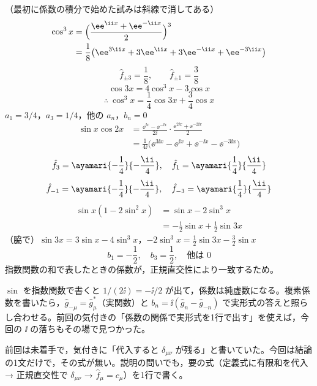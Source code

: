 （最初に係数の積分で始めた試みは斜線で消してある）
\begin{align*}
  \cos^{3}x&=\Bigl(\frac{\ee^{\ii x}+\ee^{-\ii x}}{2}\Bigr)^{3}\\
  &=\frac{1}{8}\bigl(\ee^{3\ii x}+3\ee^{\ii x}+3\ee^{-\ii x}+\ee^{-3\ii x}\bigr)
\end{align*}
\[ \hat{f}_{\pm3}=\frac{1}{8},\qquad\hat{f}_{\pm1}=\frac{3}{8} \]
\[ \cos3x=4\cos^{3}x-3\cos x \]
\[ \therefore\ \cos^{3}x=\frac{1}{4}\cos3x+\frac{3}{4}\cos x \]
$a_1=3/4$，$a_3=1/4$，他の $a_n$，$b_n=0$
\begin{align*}
  \sin x\cos2x&=\frac{\ee^{\ii x}-\ee^{-\ii x}}{2\ii}\cdot\frac{\ee^{2\ii x}+\ee^{-2\ii x}}{2}\\
  &=\frac{1}{4\ii}\bigl(\ee^{3\ii x}-\ee^{\ii x}+\ee^{-\ii x}-\ee^{-3\ii x}\bigr)
\end{align*}
\[ \hat{f}_3=\ayamari{-\frac{1}{4}}{-\frac{\ii}{4}},\quad\hat{f}_1=\ayamari{\frac{1}{4}}{\frac{\ii}{4}} \]
\[ \hat{f}_{-1}=\ayamari{-\frac{1}{4}}{-\frac{\ii}{4}},\quad\hat{f}_{-3}=\ayamari{\frac{1}{4}}{\frac{\ii}{4}} \]
\begin{align*}
  \sin x(1-2\sin^{2}x)&=\sin x-2\sin^{3}x\\
  &=-\frac{1}{2}\sin x+\frac{1}{2}\sin3x
\end{align*}
（脇で）$\sin3x=3\sin x-4\sin^{3}x$，$-2\sin^{3}x=\frac{1}{2}\sin3x-\frac{3}{2}\sin x$
\[ b_1=-\frac{1}{2},\quad b_3=\frac{1}{2},\quad\text{他は }0 \]
指数関数の和で表したときの係数が，正規直交性により一致するため。
\item {} $\sin$ を指数関数で書くと $1/(2\ii)=-\ii/2$ が出て，係数は純虚数になる。複素係数を書いたら，$\hat{g}_{-\mu}=\hat{g}_{\mu}^{*}$（実関数）と $b_n=\ii(\hat{g}_n-\hat{g}_{-n})$ で実形式の答えと照らし合わせる。前回の気付きの「係数の関係で実形式を1行で出す」を使えば，今回の $\ii$ の落ちもその場で見つかった。
\item {} 前回は未着手で，気付きに「代入すると $\delta_{\mu\nu}$ が残る」と書いていた。今回は結論の1文だけで，その式が無い。説明の問いでも，要の式（定義式に有限和を代入 → 正規直交性で $\delta_{\mu\nu}$ → $\hat{f}_{\mu}=c_{\mu}$）を1行で書く。
